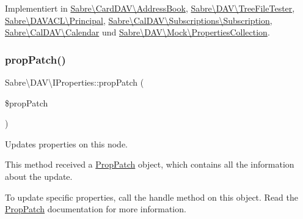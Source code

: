 Implementiert in \mbox{\hyperlink{class_sabre_1_1_card_d_a_v_1_1_address_book_aea76f0a02701bda8632ec7bdfb0f3681}{Sabre\textbackslash{}\+Card\+D\+A\+V\textbackslash{}\+Address\+Book}}, \mbox{\hyperlink{class_sabre_1_1_d_a_v_1_1_tree_file_tester_a5339786bcd3f76824b00e09f0261036e}{Sabre\textbackslash{}\+D\+A\+V\textbackslash{}\+Tree\+File\+Tester}}, \mbox{\hyperlink{class_sabre_1_1_d_a_v_a_c_l_1_1_principal_ac6b4a0da6c62db2d022ae1d413fa7e71}{Sabre\textbackslash{}\+D\+A\+V\+A\+C\+L\textbackslash{}\+Principal}}, \mbox{\hyperlink{class_sabre_1_1_cal_d_a_v_1_1_subscriptions_1_1_subscription_a69806d6c8262031418a9e0e19e36a8b7}{Sabre\textbackslash{}\+Cal\+D\+A\+V\textbackslash{}\+Subscriptions\textbackslash{}\+Subscription}}, \mbox{\hyperlink{class_sabre_1_1_cal_d_a_v_1_1_calendar_a44acbaebc3c3374606e67011a09c6685}{Sabre\textbackslash{}\+Cal\+D\+A\+V\textbackslash{}\+Calendar}} und \mbox{\hyperlink{class_sabre_1_1_d_a_v_1_1_mock_1_1_properties_collection_a28e9b64c14a61b61a3ab8c7a4443d362}{Sabre\textbackslash{}\+D\+A\+V\textbackslash{}\+Mock\textbackslash{}\+Properties\+Collection}}.

\mbox{\label{interface_sabre_1_1_d_a_v_1_1_i_properties_a90973262bb85b17f98183ecd600acd84}} 
\subsubsection{\texorpdfstring{prop\+Patch()}{propPatch()}}
{\footnotesize\ttfamily Sabre\textbackslash{}\+D\+A\+V\textbackslash{}\+I\+Properties\+::prop\+Patch (\begin{DoxyParamCaption}\item[{\mbox{\hyperlink{class_sabre_1_1_d_a_v_1_1_prop_patch}{Prop\+Patch}}}]{\$prop\+Patch }\end{DoxyParamCaption})}

Updates properties on this node.

This method received a \mbox{\hyperlink{class_sabre_1_1_d_a_v_1_1_prop_patch}{Prop\+Patch}} object, which contains all the information about the update.

To update specific properties, call the \textquotesingle{}handle\textquotesingle{} method on this object. Read the \mbox{\hyperlink{class_sabre_1_1_d_a_v_1_1_prop_patch}{Prop\+Patch}} documentation for more information.


